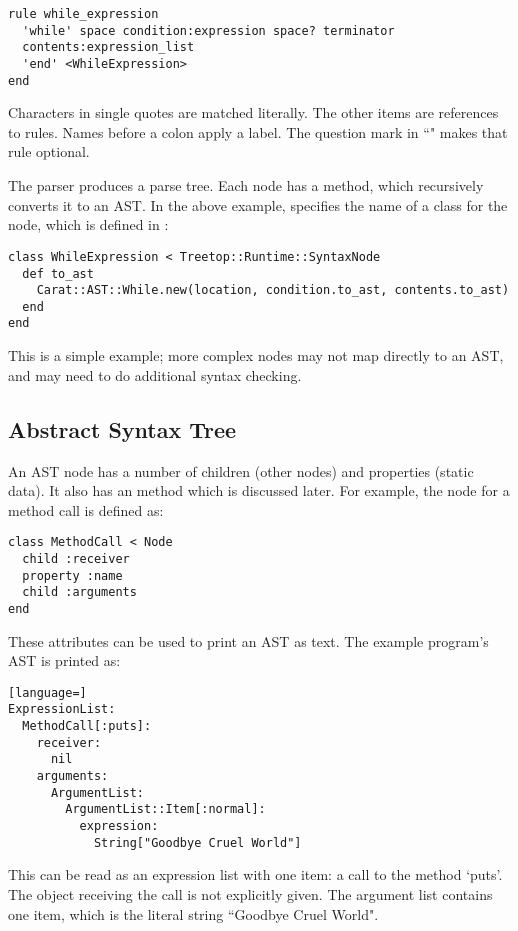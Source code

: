 \begin{lstlisting}[language=treetop]
rule while_expression
  'while' space condition:expression space? terminator
  contents:expression_list
  'end' <WhileExpression>
end
\end{lstlisting}

Characters in single quotes are matched literally. The other items are references to rules. Names before a colon apply a label. The question mark in ``" makes that rule optional.

The parser produces a parse tree. Each node has a  method, which recursively converts it to an AST. In the above example,  specifies the name of a class for the node, which is defined in :

\begin{lstlisting}
class WhileExpression < Treetop::Runtime::SyntaxNode
  def to_ast
    Carat::AST::While.new(location, condition.to_ast, contents.to_ast)
  end
end
\end{lstlisting}

This is a simple example; more complex nodes may not map directly to an AST, and may need to do additional syntax checking.

\subsection{Abstract Syntax Tree}

An AST node has a number of children (other nodes) and properties (static data). It also has an  method which is discussed later. For example, the node for a method call is defined as:

\begin{lstlisting}
class MethodCall < Node
  child :receiver
  property :name
  child :arguments
end
\end{lstlisting}

These attributes can be used to print an AST as text. The example program's AST is printed as:

\begin{lstlisting}[language=]
ExpressionList:
  MethodCall[:puts]:
    receiver:
      nil
    arguments:
      ArgumentList:
        ArgumentList::Item[:normal]:
          expression:
            String["Goodbye Cruel World"]
\end{lstlisting}

This can be read as an expression list with one item: a call to the method `puts'. The object receiving the call is not explicitly given. The argument list contains one item, which is the literal string ``Goodbye Cruel World".

